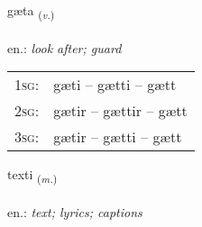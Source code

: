 \documentclass[frontgrid, backgrid]{flacards}\usepackage[]{graphicx}\usepackage[]{xcolor}
\begin{document}
\renewcommand{\blhead}{\vskip5pt {\small\bfseries\footnotesize Sagnorð | Verb }}
\renewcommand{\bcfoot}{\vskip5pt \hspace{2pt}{\small\bfseries\footnotesize 1K}}


{gæta \small{\textsubscript{(\textit{v.})}} \\[1ex] %
\textphonetic{[caiːta]} \\
en.: \emph{look after; guard} \\  [2ex]
\renewcommand*{\arraystretch}{0.8}
\begin{tabular}{p{1cm}l}
\textsc{1sg}: & gæti -- gætti -- gætt \\ 
\textsc{2sg}: & gætir -- gættir -- gætt \\ 
\textsc{3sg}: & gætir -- gætti -- gætt \\ 
\end{tabular}
}

\renewcommand{\flhead}{\vskip5pt \fboxsep=0pt {\small\bfseries\footnotesize Nafnorð | Noun}}
\renewcommand{\fcfoot}{\vskip5pt \fboxsep=0pt \hspace{2pt}{\small\bfseries\footnotesize 1K}}

\renewcommand{\blhead}{\vskip5pt {\small\bfseries\footnotesize Nafnorð | Noun }}
\renewcommand{\bcfoot}{\vskip5pt \hspace{2pt}{\small\bfseries\footnotesize 1K}}


{texti \small{\textsubscript{(\textit{m.})}} \\[1ex] %
\textphonetic{[tʰɛkstɪ]} \\
en.: \emph{text;  lyrics; captions} \\  [2ex]
\renewcommand*{\arraystretch}{0.8}
}

\renewcommand{\flhead}{\vskip5pt \fboxsep=0pt {\small\bfseries\footnotesize Nafnorð | Noun}}
\renewcommand{\fcfoot}{\vskip5pt \fboxsep=0pt \hspace{2pt}{\small\bfseries\footnotesize 1K}}
\end{document}
